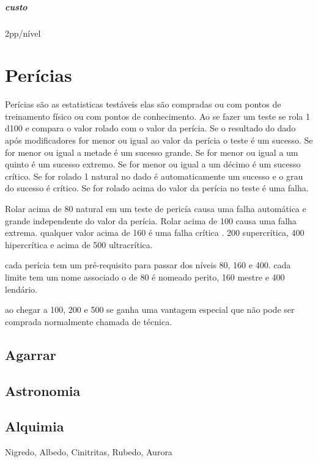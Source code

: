 \paragraph{custo} 2pp/nível
%
%
%
%
\chapter{Perícias}
Perícias são as estatisticas testáveis elas são compradas ou com pontos de treinamento físico ou com pontos de conhecimento.
Ao se fazer um teste se rola 1 d100 e compara o valor rolado com o valor da perícia.
Se o resultado do dado após modificadores for menor ou igual ao valor da perícia o teste é um sucesso.
Se for menor ou igual a metade é um sucesso grande.
Se for menor ou igual a um quinto é um sucesso extremo.
Se for menor ou igual a um décimo é um sucesso crítico.
Se for rolado 1 natural no dado é automaticamente um sucesso e o grau do sucesso é crítico.
Se for rolado acima do valor da perícia no teste é uma falha.

Rolar acima de 80 natural em um teste de pericía causa uma falha automática e grande independente do valor da perícia.
Rolar acima de 100 causa uma falha extrema. qualquer valor acima de 160 é uma falha crítica .
200 supercrítica, 400 hipercrítica e acima de 500 ultracrítica.

cada perícia tem um pré-requisito para passar dos níveis 80, 160 e 400.
cada limite tem um nome associado o de 80 é nomeado perito, 160 mestre e 400 lendário.

ao chegar a 100, 200 e 500 se ganha uma vantagem especial que não pode ser comprada normalmente chamada de técnica.
\section{Agarrar}
\section{Astronomia}
\section{Alquimia} Nigredo, Albedo, Cinitritas, Rubedo, Aurora%
